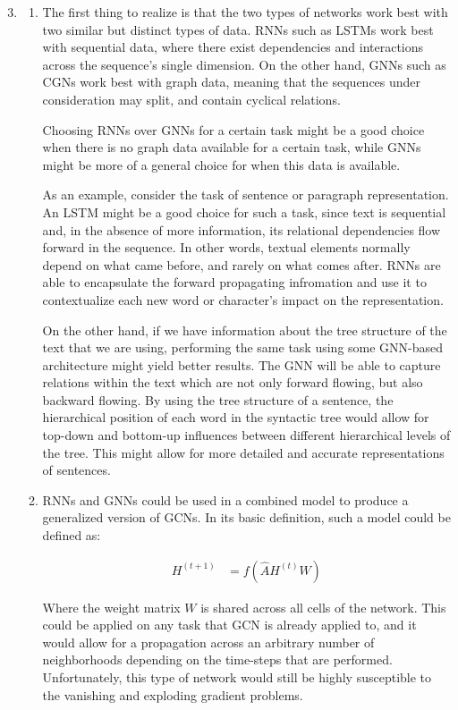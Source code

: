 \documentclass{article}
\begin{document}
\begin{enumerate}[label=\textbf{3.\arabic*}]
  \setcounter{enumi}{2}
  \item

  \begin{enumerate}[label=\textbf{(\alph*)}]
    \item
    The first thing to realize is that the two types of networks work best with two similar but distinct types of data. RNNs such as LSTMs work best with sequential data, where there exist dependencies and interactions across the sequence's single dimension. On the other hand, GNNs such as CGNs work best with graph data, meaning that the sequences under consideration may split, and contain cyclical relations.

    Choosing RNNs over GNNs for a certain task might be a good choice when there is no graph data available for a certain task, while GNNs might be more of a general choice for when this data is available.

    As an example, consider the task of sentence or paragraph representation. An LSTM might be a good choice for such a task, since text is sequential and, in the absence of more information, its relational dependencies flow forward in the sequence. In other words, textual elements normally depend on what came before, and rarely on what comes after. RNNs are able to encapsulate the forward propagating infromation and use it to contextualize each new word or character's impact on the representation.

    On the other hand, if we have information about the tree structure of the text that we are using, performing the same task using some GNN-based architecture might yield better results. The GNN will be able to capture relations within the text which are not only forward flowing, but also backward flowing. By using the tree structure of a sentence, the hierarchical position of each word in the syntactic tree would allow for top-down and bottom-up influences between different hierarchical levels of the tree. This might allow for more detailed and accurate representations of sentences.

    \item
    RNNs and GNNs could be used in a combined model to produce a generalized version of GCNs. In its basic definition, such a model could be defined as:

    \begin{align*}
      H^{(t+1)} &= f\left( \hat{A} H^{(t)} W \right)
    \end{align*}

    Where the weight matrix $W$ is shared across all cells of the network. This could be applied on any task that GCN is already applied to, and it would allow for a propagation across an arbitrary number of neighborhoods depending on the time-steps that are performed. Unfortunately, this type of network would still be highly susceptible to the vanishing and exploding gradient problems.
  \end{enumerate}
\end{enumerate}



\end{document}
